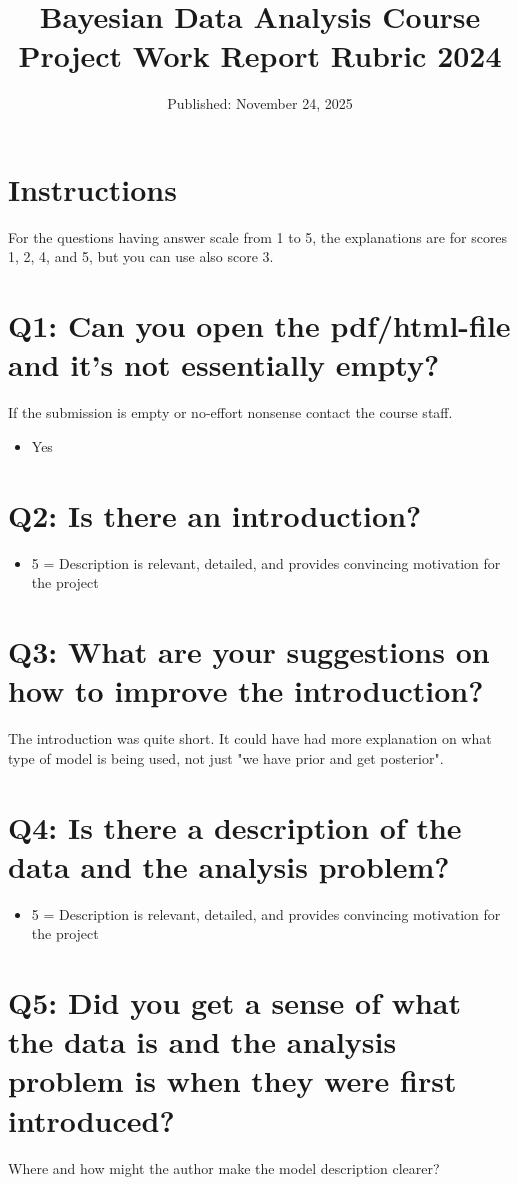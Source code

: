 \documentclass[11pt,a4paper]{article}
\title{Bayesian Data Analysis Course\\Project Work Report Rubric 2024}
\author{}
\date{Published: November 24, 2025}
\begin{document}
\maketitle

\section*{Instructions}
For the questions having answer scale from 1 to 5, the explanations are for scores 1, 2, 4, and 5, but you can use also score 3.

\section{Q1: Can you open the pdf/html-file and it's not essentially empty?}
If the submission is empty or no-effort nonsense contact the course staff.
\begin{itemize}
    \item Yes
\end{itemize}

\section{Q2: Is there an introduction?}
\begin{itemize}
    \item 5 = Description is relevant, detailed, and provides convincing motivation for the project
\end{itemize}

\section{Q3: What are your suggestions on how to improve the introduction?}
The introduction was quite short. It could have had more explanation on what type of model is being used, not just "we have prior and get posterior".

\section{Q4: Is there a description of the data and the analysis problem?}
\begin{itemize}
    \item 5 = Description is relevant, detailed, and provides convincing motivation for the project
\end{itemize}

\section{Q5: Did you get a sense of what the data is and the analysis problem is when they were first introduced?}
Where and how might the author make the model description clearer?
\end{document}
